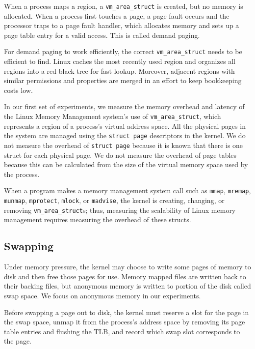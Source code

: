 \documentclass[twocolumn,11pt]{article}
\begin{document}
When a process maps a region, a \texttt{vm\_area\_struct} is created, but no
memory is allocated. When a process first touches a page, a page fault occurs
and the processor traps to a page fault handler, which allocates memory and
sets up a page table entry for a valid access. This is called demand paging.

For demand paging to work efficiently, the correct \texttt{vm\_area\_struct}
needs to be efficient to find. Linux caches the most recently used region and
organizes all regions into a red-black tree for fast lookup.  Moreover,
adjacent regions with similar permissions and properties are merged in an
effort to keep bookkeeping costs low.

In our first set of experiments, we measure the memory overhead and latency of
the Linux Memory Management system's use of \texttt{vm\_area\_struct}, which
represents a region of a process's virtual address space. All the physical
pages in the system are managed using the \texttt{struct page} descriptors in
the kernel.  We do not measure the overhead of \texttt{struct page} because it
is known that there is one struct for each physical page. We do not measure the
overhead of page tables because this can be calculated from the size of the
virtual memory space used by the process.  

When a program makes a memory
management system call such as \texttt{mmap}, \texttt{mremap}, \texttt{munmap},
\texttt{mprotect}, \texttt{mlock}, or \texttt{madvise}, the kernel is creating,
changing, or removing \texttt{vm\_area\_struct}s; thus, measuring the
scalability of Linux memory management requires measuring the overhead of these
structs.

\subsection{Swapping}

Under memory pressure, the kernel may choose to write some pages of memory to
disk and then free those pages for use. Memory mapped files are written back to
their backing files, but anonymous memory is written to portion of the disk
called swap space. We focus on anonymous memory in our experiments.

Before swapping a page out to disk, the kernel must reserve a slot for the page
in the swap space, unmap it from the process's address space by removing its
page table entries and flushing the TLB, and record which swap slot corresponds
to the page.
\end{document}
